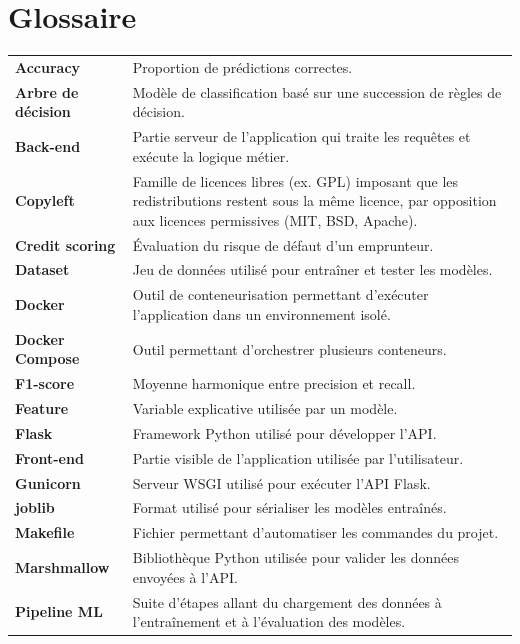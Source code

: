 \documentclass[12pt,a4paper,openany]{report}
\begin{document}
\clearpage
{}
{}
\chapter*{Glossaire}

{\renewcommand{\arraystretch}{1.3}
\begin{longtable}{@{}>{\bfseries}p{3.6cm} p{12cm}@{}}
    Accuracy              & Proportion de prédictions correctes. \\
    Arbre de décision     & Modèle de classification basé sur une succession de règles de décision. \\
    Back-end              & Partie serveur de l'application qui traite les requêtes et exécute la logique métier. \\
    Copyleft              & Famille de licences libres (ex. GPL) imposant que les redistributions restent sous la même licence, par opposition aux licences permissives (MIT, BSD, Apache). \\
    Credit scoring        & Évaluation du risque de défaut d'un emprunteur. \\
    Dataset               & Jeu de données utilisé pour entraîner et tester les modèles. \\
    Docker                & Outil de conteneurisation permettant d'exécuter l'application dans un environnement isolé. \\
    Docker Compose        & Outil permettant d'orchestrer plusieurs conteneurs. \\
    F1-score              & Moyenne harmonique entre precision et recall. \\
    Feature               & Variable explicative utilisée par un modèle. \\
    Flask                 & Framework Python utilisé pour développer l'API. \\
    Front-end             & Partie visible de l'application utilisée par l'utilisateur. \\
    Gunicorn              & Serveur WSGI utilisé pour exécuter l'API Flask. \\
    joblib                & Format utilisé pour sérialiser les modèles entraînés. \\
    Makefile              & Fichier permettant d'automatiser les commandes du projet. \\
    Marshmallow           & Bibliothèque Python utilisée pour valider les données envoyées à l'API. \\
    Pipeline ML           & Suite d'étapes allant du chargement des données à l'entraînement et à l'évaluation des modèles. \\

\end{longtable}}
\end{document}

